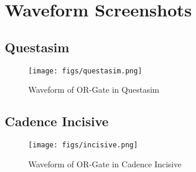 \documentclass[paper=letter, fontsize=11pt]{scrartcl} %
\numberwithin{equation}{section} %
\numberwithin{figure}{section} %
\numberwithin{table}{section} %
\begin{document}
\section{Waveform Screenshots}

\subsection{Questasim}

\begin{figure}[hb]
	\caption{Waveform of OR-Gate in Questasim}
	\centering
			\texttt{[image: figs/questasim.png]} %
				\label{fig:questasim}
\end{figure}

\subsection{Cadence Incisive}

\begin{figure}[hb]
	\caption{Waveform of OR-Gate in Cadence Incisive}
	\centering
			\texttt{[image: figs/incisive.png]} %
				\label{fig:incisive}
\end{figure}
\end{document}
